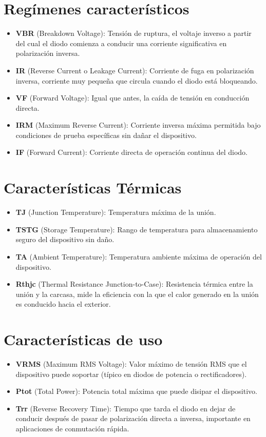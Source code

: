 \section{Regímenes característicos}
\begin{itemize}
  \item \textbf{VBR} (Breakdown Voltage): Tensión de ruptura, el voltaje inverso a partir del cual el diodo comienza a conducir una corriente significativa en polarización inversa.
  \item \textbf{IR} (Reverse Current o Leakage Current): Corriente de fuga en polarización inversa, corriente muy pequeña que circula cuando el diodo está bloqueando.
  \item \textbf{VF} (Forward Voltage): Igual que antes, la caída de tensión en conducción directa.
  \item \textbf{IRM} (Maximum Reverse Current): Corriente inversa máxima permitida bajo condiciones de prueba específicas sin dañar el dispositivo.
  \item \textbf{IF} (Forward Current): Corriente directa de operación continua del diodo.
\end{itemize}

\section{Características Térmicas}
\begin{itemize}
  \item \textbf{TJ} (Junction Temperature): Temperatura máxima de la unión.
  \item \textbf{TSTG} (Storage Temperature): Rango de temperatura para almacenamiento seguro del dispositivo sin daño.
  \item \textbf{TA} (Ambient Temperature): Temperatura ambiente máxima de operación del dispositivo.
  \item \textbf{Rthjc} (Thermal Resistance Junction-to-Case): Resistencia térmica entre la unión y la carcasa, mide la eficiencia con la que el calor generado en la unión es conducido hacia el exterior.
\end{itemize}

\section{Características de uso}
\begin{itemize}
  \item \textbf{VRMS} (Maximum RMS Voltage): Valor máximo de tensión RMS que el dispositivo puede soportar (típico en diodos de potencia o rectificadores).
  \item \textbf{Ptot} (Total Power): Potencia total máxima que puede disipar el dispositivo.
  \item \textbf{Trr} (Reverse Recovery Time): Tiempo que tarda el diodo en dejar de conducir después de pasar de polarización directa a inversa, importante en aplicaciones de conmutación rápida.
\end{itemize}
